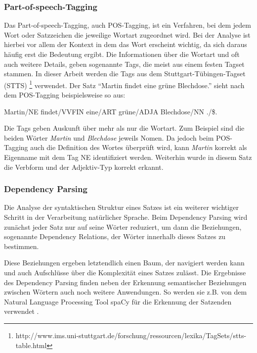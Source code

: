 \subsubsection*{Part-of-speech-Tagging}
Das Part-of-speech-Tagging, auch POS-Tagging, ist ein Verfahren, bei dem jedem Wort oder Satzzeichen die jeweilige Wortart zugeordnet wird. Bei der Analyse ist hierbei vor allem der Kontext in dem das Wort erscheint wichtig, da sich daraus häufig erst die Bedeutung ergibt. Die Informationen über die Wortart und oft auch weitere Details, geben sogenannte Tags, die meist aus einem festen Tagset stammen. In dieser Arbeit werden die Tags aus dem Stuttgart-Tübingen-Tagset (STTS) \footnote{http://www.ims.uni-stuttgart.de/forschung/ressourcen/lexika/TagSets/stts-table.html} verwendet. Der Satz "`Martin findet eine grüne Blechdose."' sieht nach dem POS-Tagging beispielsweise so aus:

Martin/NE findet/VVFIN eine/ART grüne/ADJA Blechdose/NN ./\$.

Die Tags geben Auskunft über mehr als nur die Wortart. Zum Beispiel sind die beiden Wörter \textit{Martin} und \textit{Blechdose} jeweils Nomen. Da jedoch beim POS-Tagging auch die Definition des Wortes überprüft wird, kann \textit{Martin} korrekt als Eigenname mit dem Tag NE identifiziert werden. Weiterhin wurde in diesem Satz die Verbform und der Adjektiv-Typ korrekt erkannt.

\subsubsection*{Dependency Parsing}
Die Analyse der syntaktischen Struktur eines Satzes ist ein weiterer wichtiger Schritt in der Verarbeitung natürlicher Sprache. Beim Dependency Parsing wird zunächst jeder Satz nur auf seine Wörter reduziert, um dann die Beziehungen, sogenannte Dependency Relations, der Wörter innerhalb dieses Satzes zu bestimmen.


Diese Beziehungen ergeben letztendlich einen Baum, der navigiert werden kann und auch Aufschlüsse über die Komplexität eines Satzes zulässt. Die Ergebnisse des Dependency Parsing finden neben der Erkennung semantischer Beziehungen zwischen Wörtern auch noch weitere Anwendungen. So werden sie z.B. von dem Natural Language Processing Tool spaCy für die Erkennung der Satzenden  verwendet \cite{spacyDependencyParsing}.

